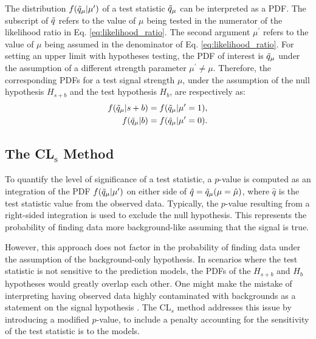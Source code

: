 The distribution $f(\Tilde{q}_{\mu}|\mu^{\prime})$ of a test statistic $\Tilde{q}_\mu$ can be interpreted as a PDF.
The subscript of $\Tilde{q}$ refers to the value of $\mu$ being tested in the numerator of the likelihood ratio in Eq. \ref{eq:likelihood_ratio}. 
The second argument $\mu^{\prime}$ refers to the value of $\mu$ being assumed in the denominator of Eq. \ref{eq:likelihood_ratio}.
For setting an upper limit with hypotheses testing, the PDF of interest is $\Tilde{q}_{\mu}$ under the assumption of a different strength parameter $\mu^{\prime} \neq \mu$.
Therefore, the corresponding PDFs for a test signal strength $\mu$, under the assumption of the null hypothesis $H_{s+b}$ and the test hypothesis $H_b$, are respectively as:
\begin{align}
    f(\Tilde{q}_\mu | s + b ) &= f(\Tilde{q}_\mu | \mu^{\prime} = 1 ), \\
    f(\Tilde{q}_\mu | b ) &= f(\Tilde{q}_\mu | \mu^{\prime} = 0 ).
\end{align}

\subsection{The CL$_{\mathrm{s}}$ Method}
\label{sec:cls}

To quantify the level of significance of a test statistic, a $p$-value is computed as an integration of the PDF $f(\Tilde{q}_{\mu}|\mu^{\prime})$ on either side of $\hat{q} = \Tilde{q}_{\mu}(\mu = \hat{\mu}) $, where $\hat{q}$ is the test statistic value from the observed data.
Typically, the $p$-value resulting from a right-sided integration is used to exclude the null hypothesis.
This represents the probability of finding data more background-like assuming that the signal is true.



However, this approach does not factor in the probability of finding data under the assumption of the background-only hypothesis.
In scenarios where the test statistic is not sensitive to the prediction models, the PDFs of the $H_{s+b}$ and $H_b$ hypotheses would greatly overlap each other.
One might make the mistake of interpreting having observed data highly contaminated with backgrounds as a statement on the signal hypothesis \cite{CLs_Read}.
The CL$_s$ method addresses this issue by introducing a modified $p$-value, to include a penalty accounting for the sensitivity of the test statistic is to the models.

